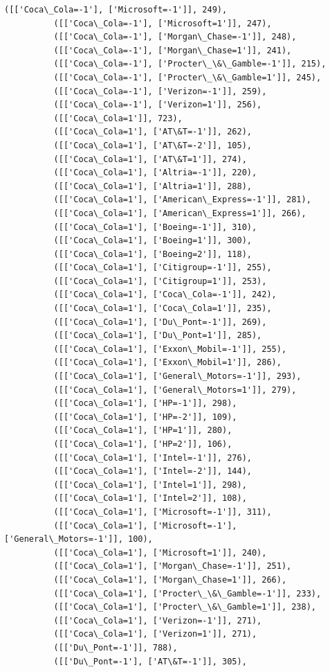 \documentclass[11pt]{article}
\begin{document}
\begin{Verbatim}[commandchars=\\\{\}]
          ([['Coca\_Cola=-1'], ['Microsoft=-1']], 249),
          ([['Coca\_Cola=-1'], ['Microsoft=1']], 247),
          ([['Coca\_Cola=-1'], ['Morgan\_Chase=-1']], 248),
          ([['Coca\_Cola=-1'], ['Morgan\_Chase=1']], 241),
          ([['Coca\_Cola=-1'], ['Procter\_\&\_Gamble=-1']], 215),
          ([['Coca\_Cola=-1'], ['Procter\_\&\_Gamble=1']], 245),
          ([['Coca\_Cola=-1'], ['Verizon=-1']], 259),
          ([['Coca\_Cola=-1'], ['Verizon=1']], 256),
          ([['Coca\_Cola=1']], 723),
          ([['Coca\_Cola=1'], ['AT\&T=-1']], 262),
          ([['Coca\_Cola=1'], ['AT\&T=-2']], 105),
          ([['Coca\_Cola=1'], ['AT\&T=1']], 274),
          ([['Coca\_Cola=1'], ['Altria=-1']], 220),
          ([['Coca\_Cola=1'], ['Altria=1']], 288),
          ([['Coca\_Cola=1'], ['American\_Express=-1']], 281),
          ([['Coca\_Cola=1'], ['American\_Express=1']], 266),
          ([['Coca\_Cola=1'], ['Boeing=-1']], 310),
          ([['Coca\_Cola=1'], ['Boeing=1']], 300),
          ([['Coca\_Cola=1'], ['Boeing=2']], 118),
          ([['Coca\_Cola=1'], ['Citigroup=-1']], 255),
          ([['Coca\_Cola=1'], ['Citigroup=1']], 253),
          ([['Coca\_Cola=1'], ['Coca\_Cola=-1']], 242),
          ([['Coca\_Cola=1'], ['Coca\_Cola=1']], 235),
          ([['Coca\_Cola=1'], ['Du\_Pont=-1']], 269),
          ([['Coca\_Cola=1'], ['Du\_Pont=1']], 285),
          ([['Coca\_Cola=1'], ['Exxon\_Mobil=-1']], 255),
          ([['Coca\_Cola=1'], ['Exxon\_Mobil=1']], 286),
          ([['Coca\_Cola=1'], ['General\_Motors=-1']], 293),
          ([['Coca\_Cola=1'], ['General\_Motors=1']], 279),
          ([['Coca\_Cola=1'], ['HP=-1']], 298),
          ([['Coca\_Cola=1'], ['HP=-2']], 109),
          ([['Coca\_Cola=1'], ['HP=1']], 280),
          ([['Coca\_Cola=1'], ['HP=2']], 106),
          ([['Coca\_Cola=1'], ['Intel=-1']], 276),
          ([['Coca\_Cola=1'], ['Intel=-2']], 144),
          ([['Coca\_Cola=1'], ['Intel=1']], 298),
          ([['Coca\_Cola=1'], ['Intel=2']], 108),
          ([['Coca\_Cola=1'], ['Microsoft=-1']], 311),
          ([['Coca\_Cola=1'], ['Microsoft=-1'], ['General\_Motors=-1']], 100),
          ([['Coca\_Cola=1'], ['Microsoft=1']], 240),
          ([['Coca\_Cola=1'], ['Morgan\_Chase=-1']], 251),
          ([['Coca\_Cola=1'], ['Morgan\_Chase=1']], 266),
          ([['Coca\_Cola=1'], ['Procter\_\&\_Gamble=-1']], 233),
          ([['Coca\_Cola=1'], ['Procter\_\&\_Gamble=1']], 238),
          ([['Coca\_Cola=1'], ['Verizon=-1']], 271),
          ([['Coca\_Cola=1'], ['Verizon=1']], 271),
          ([['Du\_Pont=-1']], 788),
          ([['Du\_Pont=-1'], ['AT\&T=-1']], 305),

\end{Verbatim}
\end{document}
